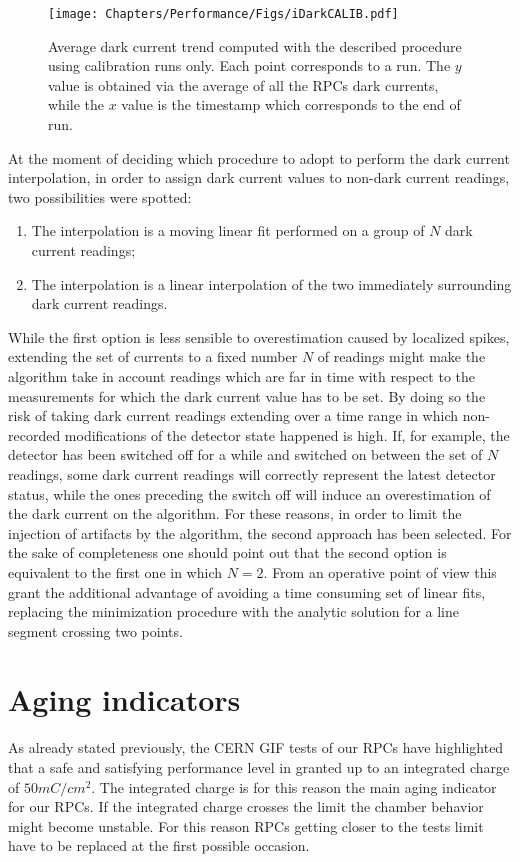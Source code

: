 \begin{figure}[!t]
\begin{center}
\texttt{[image: Chapters/Performance/Figs/iDarkCALIB.pdf]}
\caption{Average dark current trend computed with the described procedure using calibration runs only. Each point corresponds to a run. The $y$ value is obtained via the average of all the RPCs dark currents, while the $x$ value is the timestamp which corresponds to the end of run.}
\label{fig:iDarkCALIB}
\end{center}
\end{figure}

At the moment of deciding which procedure to adopt to perform the dark current interpolation, in order to assign dark current values to non-dark current readings, two possibilities were spotted:
\begin{enumerate}
\item The interpolation is a moving linear fit performed on a group of $N$ dark current readings;
\item The interpolation is a linear interpolation of the two immediately surrounding dark current readings.
\end{enumerate}

While the first option is less sensible to overestimation caused by localized spikes, extending the set of currents to a fixed number $N$ of readings might make the algorithm take in account readings which are far in time with respect to the measurements for which the dark current value has to be set.
By doing so the risk of taking dark current readings extending over a time range in which non-recorded modifications of the detector state happened is high.
If, for example, the detector has been switched off for a while and switched on between the set of $N$ readings, some dark current readings will correctly represent the latest detector status, while the ones preceding the switch off will induce an overestimation of the dark current on the algorithm.
For these reasons, in order to limit the injection of artifacts by the algorithm, the second approach has been selected.
For the sake of completeness one should point out that the second option is equivalent to the first one in which $N=2$.
From an operative point of view this grant the additional advantage of avoiding a time consuming set of linear fits, replacing the minimization procedure with the analytic solution for a line segment crossing two points.

\section{Aging indicators}
As already stated previously, the CERN GIF tests of our RPCs have highlighted that a safe and satisfying performance level in granted up to an integrated charge of $50 mC/cm^2$.
The integrated charge is for this reason the main aging indicator for our RPCs.
If the integrated charge crosses the limit the chamber behavior might become unstable.
For this reason RPCs getting closer to the tests limit have to be replaced at the first possible occasion.

